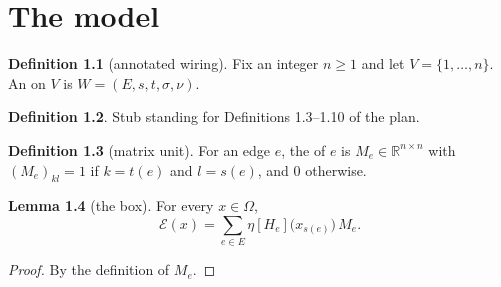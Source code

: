 \documentclass{report}
\theoremstyle{definition}
\newtheorem{definition}{Definition}[chapter]
\newtheorem{lemma}[definition]{Lemma}
\begin{document}
\chapter{The model}

\begin{definition}[annotated wiring]\label{def:wiring}
  Fix an integer $n\ge1$ and let $V=\{1,\dots,n\}$. An  on $V$ is $W=(E,s,t,\sigma,\nu)$.
\end{definition}

\begin{definition}\label{def:stub}
  Stub standing for Definitions 1.3--1.10 of the plan.
\end{definition}

\begin{definition}[matrix unit]\label{def:matrix-unit}
  For an edge $e$, the  of $e$ is $M_e\in\mathbb R^{n\times n}$ with $(M_e)_{kl}=1$ if $k=t(e)$ and $l=s(e)$, and $0$ otherwise.
\end{definition}

\begin{lemma}[the box]\label{lem:box}
  For every $x\in\Omega$,
  \[ \mathcal E(x)=\sum_{e\in E}\eta[H_e]\bigl(x_{s(e)}\bigr)\,M_e . \]
\end{lemma}
\begin{proof}
  By the definition of $M_e$.
\end{proof}
\end{document}
